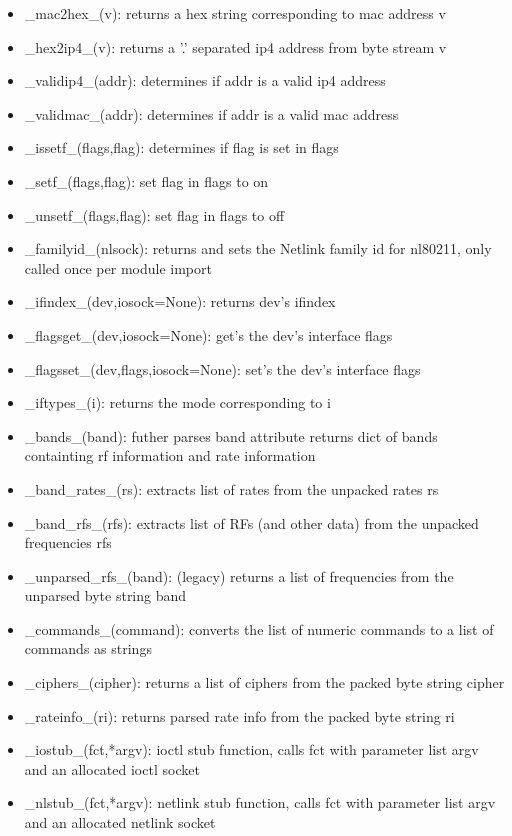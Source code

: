 \documentclass[11pt]{article}
\begin{document}
\begin{appendices}
\begin{itemize}
\begin{itemize}
\item \_mac2hex\_(v): returns a hex string corresponding to mac address v
\item \_hex2ip4\_(v): returns a '.' separated ip4 address from byte stream v
\item \_validip4\_(addr): determines if addr is a valid ip4 address
\item \_validmac\_(addr): determines if addr is a valid mac address
\item \_issetf\_(flags,flag): determines if flag is set in flags
\item \_setf\_(flags,flag): set flag in flags to on
\item \_unsetf\_(flags,flag): set flag in flags to off
\item \_familyid\_(nlsock): returns and sets the Netlink family id for nl80211, 
only called once per module import
\item \_ifindex\_(dev,iosock=None): returns dev's ifindex
\item \_flagsget\_(dev,iosock=None): get's the dev's interface flags
\item \_flagsset\_(dev,flags,iosock=None): set's the dev's interface flags
\item \_iftypes\_(i): returns the mode corresponding to i
\item \_bands\_(band): futher parses band attribute returns dict of bands 
containting rf information and rate information
\item \_band\_rates\_(rs): extracts list of rates from the unpacked rates rs
\item \_band\_rfs\_(rfs): extracts list of RFs (and other data) from the unpacked
frequencies rfs
\item \_unparsed\_rfs\_(band): (legacy) returns a list of frequencies from the 
unparsed byte string band
\item \_commands\_(command): converts the list of numeric commands to a list of
commands as strings 
\item \_ciphers\_(cipher): returns a list of ciphers from the packed byte string
cipher
\item \_rateinfo\_(ri): returns parsed rate info from the packed byte string ri
\item \_iostub\_(fct,*argv): ioctl stub function, calls fct with parameter list 
argv and an allocated ioctl socket
\item \_nlstub\_(fct,*argv): netlink stub function, calls fct with parameter list
argv and an allocated netlink socket
\end{itemize}
\end{itemize}


\end{appendices}
\end{document}
